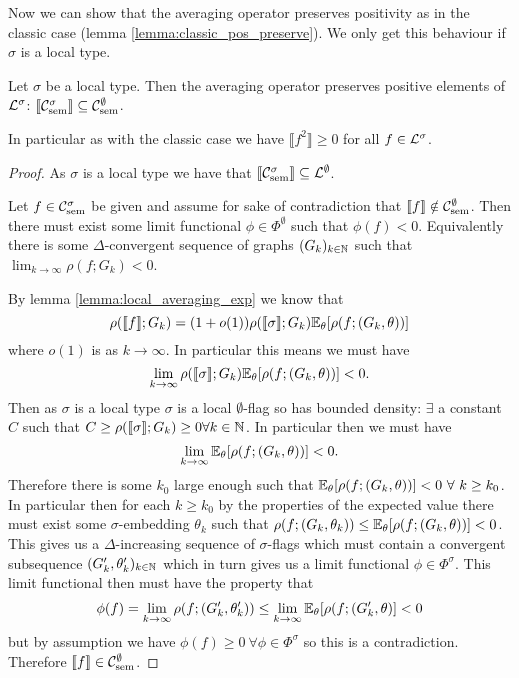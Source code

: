 Now we can show that the averaging operator preserves positivity as in the
classic case (lemma \ref{lemma:classic_pos_preserve}). We only get this
behaviour if $\sigma$ is a local type.

\begin{lemma}
    Let $\sigma$ be a local type. Then the averaging operator preserves positive
    elements of $\mathcal{L}^\sigma$:
    $\llbracket \mathcal{C}_\mathrm{sem}^\sigma \rrbracket \subseteq  \mathcal{C}_\mathrm{sem}^\emptyset$.

    In particular as with the classic case we have $\llbracket f^2 \rrbracket \geq 0$
    for all $f\in\mathcal{L}^\sigma$.
\end{lemma}

\begin{proof}
    As $\sigma$ is a local type we have that
    $\llbracket \mathcal{C}_\mathrm{sem}^\sigma \rrbracket \subseteq \mathcal{L}^\emptyset$.

    Let $f\in\mathcal{C}_\mathrm{sem}^\sigma$ be given and assume for sake of contradiction that
    $\llbracket f \rrbracket \notin\mathcal{C}_\mathrm{sem}^\emptyset$. Then there must exist
    some limit functional $\phi\in\Phi^\emptyset$ such that $\phi(f)<0$. Equivalently
    there is some $\Delta$-convergent sequence of graphs $(G_k)_{k\in\mathbb{N}}$
    such that $\lim_{k\to\infty}\rho(f; G_k) < 0$.

    By lemma \ref{lemma:local_averaging_exp} we know that
    \[
        \rho(\llbracket f\rrbracket; G_k) = (1+o(1)) \rho(\llbracket \sigma \rrbracket; G_k)
        \mathbb{E}_\theta[\rho(f; (G_k,\theta))]
    \]
    where $o(1)$ is as $k \to \infty$.
    In particular this means we must have
    \[
        \lim_{k\to\infty} \rho(\llbracket \sigma \rrbracket; G_k)
        \mathbb{E}_\theta[\rho(f; (G_k,\theta))] < 0.
    \]
    Then as $\sigma$ is a local type $\sigma$ is a local $\emptyset$-flag so has bounded
    density: $\exists$ a constant $C$ such that $C \geq \rho(\llbracket\sigma\rrbracket; G_k) \geq
    0\forall k\in\mathbb{N}$. In particular then we must have
    \[
        \lim_{k\to\infty} \mathbb{E}_\theta[\rho(f; (G_k,\theta))] < 0.
    \]
    Therefore there is some $k_0$ large enough such that
    $\mathbb{E}_\theta[\rho(f; (G_k, \theta))] < 0\ \forall\ k \geq k_0$. In particular then
    for each $k \geq k_0$ by the properties of the expected value there must exist
    some $\sigma$-embedding $\theta_k$ such that
    $\rho(f; (G_k, \theta_k)) \leq \mathbb{E}_\theta[\rho(f; (G_k,\theta))] < 0$. This gives
    us a $\Delta$-increasing sequence of $\sigma$-flags which must contain a convergent
    subsequence $(G'_k, \theta'_k)_{k\in\mathbb{N}}$
    which in turn gives us a limit functional $\phi\in\Phi^\sigma$. This limit functional
    then must have the property that
    \[
        \phi(f) = \lim_{k\to\infty}\rho(f; (G'_k, \theta'_k))
        \leq \lim_{k\to\infty} \mathbb{E}_\theta[\rho(f; (G'_k, \theta)] < 0
    \]
    but by assumption we have $\phi(f) \geq 0\ \forall \phi\in\Phi^\sigma$ so this is
    a contradiction. Therefore $\llbracket f \rrbracket \in\mathcal{C}_\mathrm{sem}^\emptyset$.
\end{proof}

